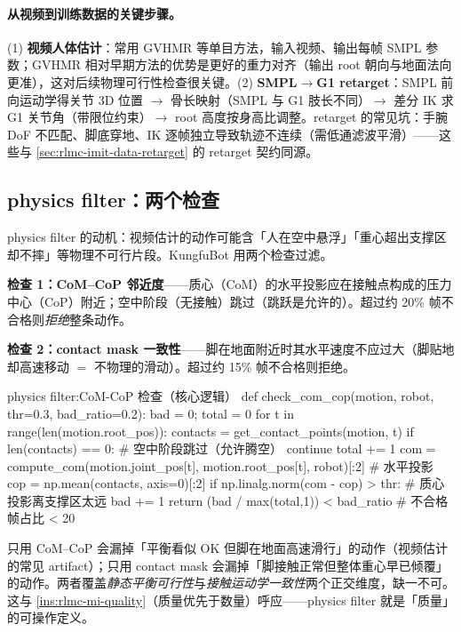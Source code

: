 \paragraph{从视频到训练数据的关键步骤。}(1) \textbf{视频人体估计}：常用 GVHMR 等单目方法，输入视频、输出每帧 SMPL 参数；GVHMR 相对早期方法的优势是更好的重力对齐（输出 root 朝向与地面法向更准），这对后续物理可行性检查很关键。(2) \textbf{SMPL$\to$G1 retarget}：SMPL 前向运动学得关节 3D 位置 $\to$ 骨长映射（SMPL 与 G1 肢长不同）$\to$ 差分 IK 求 G1 关节角（带限位约束）$\to$ root 高度按身高比调整。retarget 的常见坑：手腕 DoF 不匹配、脚底穿地、IK 逐帧独立导致轨迹不连续（需低通滤波平滑）——这些与 \cref{sec:rlmc-imit-data-retarget} 的 retarget 契约同源。

\subsection{physics filter：两个检查}
\label{sec:rlmc-mi-kungfu-filter}

physics filter 的动机：视频估计的动作可能含「人在空中悬浮」「重心超出支撑区却不摔」等物理不可行片段。KungfuBot 用两个检查过滤。

\textbf{检查 1：CoM--CoP 邻近度}——质心（CoM）的水平投影应在接触点构成的压力中心（CoP）附近；空中阶段（无接触）跳过（跳跃是允许的）。超过约 20\% 帧不合格则\emph{拒绝}整条动作。

\textbf{检查 2：contact mask 一致性}——脚在地面附近时其水平速度不应过大（脚贴地却高速移动 $=$ 不物理的滑动）。超过约 15\% 帧不合格则拒绝。

\begin{codebox}[Python]{physics filter:CoM-CoP 检查（核心逻辑）}
def check_com_cop(motion, robot, thr=0.3, bad_ratio=0.2):
    bad = 0; total = 0
    for t in range(len(motion.root_pos)):
        contacts = get_contact_points(motion, t)
        if len(contacts) == 0:                       # 空中阶段跳过（允许腾空）
            continue
        total += 1
        com = compute_com(motion.joint_pos[t], motion.root_pos[t], robot)[:2]  # 水平投影
        cop = np.mean(contacts, axis=0)[:2]
        if np.linalg.norm(com - cop) > thr:          # 质心投影离支撑区太远
            bad += 1
    return (bad / max(total,1)) < bad_ratio          # 不合格帧占比 < 20%
\end{codebox}

\begin{insight}\label{ins:rlmc-mi-filter}
只用 CoM--CoP 会漏掉「平衡看似 OK 但脚在地面高速滑行」的动作（视频估计的常见 artifact）；只用 contact mask 会漏掉「脚接触正常但整体重心早已倾覆」的动作。两者覆盖\emph{静态平衡可行性}与\emph{接触运动学一致性}两个正交维度，缺一不可。这与 \cref{ins:rlmc-mi-quality}（质量优先于数量）呼应——physics filter 就是「质量」的可操作定义。
\end{insight}

